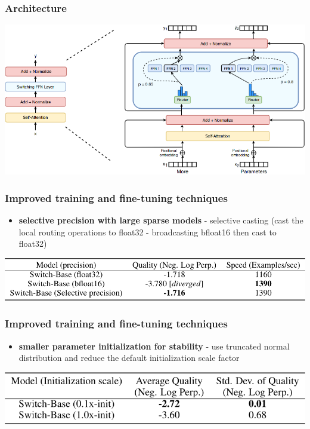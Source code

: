 \documentclass{beamer}
\begin{document}
\begin{frame}
    \frametitle{Architecture}
    \begin{center}
        \includegraphics[scale=0.42]{img/switch_transformers_architecture.png}
    \end{center}
\end{frame}

\begin{frame}
    \frametitle{Improved training and fine-tuning techniques}
    \begin{itemize}
        \item \textbf{selective precision with large sparse models} - selective casting (cast the local routing operations to float32 - broadcasting bfloat16 then cast to float32)
    \end{itemize}
    \begin{center}
        \includegraphics[scale=0.33]{img/switch_transformers_precision.png}
    \end{center}
\end{frame}

\begin{frame}
    \frametitle{Improved training and fine-tuning techniques}
    \begin{itemize}
        \item \textbf{smaller parameter initialization for stability} - use truncated normal distribution and reduce the default initialization scale factor
    \end{itemize}
    \begin{center}
        \includegraphics[scale=0.40]{img/switch_transformers_initialization.png}
    \end{center}
\end{frame}
\end{document}
